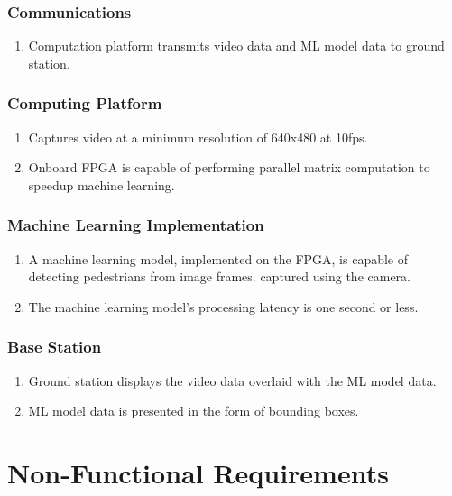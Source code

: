 \documentclass[10pt,letterpaper]{article}
\begin{document}
\subsubsection{Communications}
\begin{enumerate}[{F.CM}.1:]
	\item Computation platform transmits video data and ML model data to ground station.
\end{enumerate}

\subsubsection{Computing Platform}
\begin{enumerate}[{F.CP}.1:]
	\item Captures video at a minimum resolution of 640x480 at 10fps.
	\item Onboard FPGA is capable of performing parallel matrix computation to speedup machine learning.
\end{enumerate}

\subsubsection{Machine Learning Implementation}
\begin{enumerate}[{F.ML}.1:]
\item A machine learning model, implemented on the FPGA, is capable of detecting pedestrians from image frames. captured using the camera.
\item The machine learning model's processing latency is one second or less.

\end{enumerate}

\subsubsection{Base Station}
\begin{enumerate}[{F.BS}.1:]
    \item Ground station displays the video data overlaid with the ML model data.
	\item ML model data is presented in the form of bounding boxes.
\end{enumerate}

\section{Non-Functional Requirements}\label{section:nonfuncrec}
\end{document}

